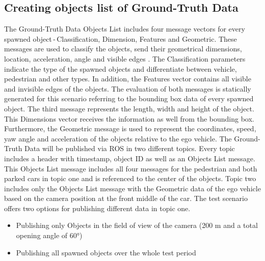 \subsection{Creating objects list of Ground-Truth Data}
The Ground-Truth Data Objects List includes four message vectors for every spawned object\,-\,Classification, Dimension, Features and Geometric. These messages are used to classify the objects, send their geometrical dimensions, location, acceleration, angle and visible edges \cite{Aeberhard}.
The Classification parameters indicate the type of the spawned objects and differentiate between vehicle, pedestrian and other types. In addition, the Features vector contains all visible and invisible edges of the objects. The evaluation of both messages is statically generated for this scenario referring to the bounding box data of every spawned object. The third message represents the length, width and height of the object. This Dimensions vector receives the information as well from the bounding box. Furthermore, the Geometric message is used to represent the coordinates, speed, yaw angle and acceleration of the objects relative to the ego vehicle. 
The Ground-Truth Data will be published via \ac{ROS} in two different topics. Every topic includes a header with timestamp, object \ac{ID} as well as an Objects List message. This Objects List message includes all four messages for the pedestrian and both parked cars in topic one and is referenced to the center of the objects. Topic two includes only the Objects List message with the Geometric data of the ego vehicle based on the camera position at the front middle of the car.
The test scenario offers two options for publishing different data in topic one.
\begin{itemize}
	\item Publishing only Objects in the field of view of the camera (200 m and a total opening angle of \ang{60})
	\item Publishing all spawned objects over the whole test period
\end{itemize}
